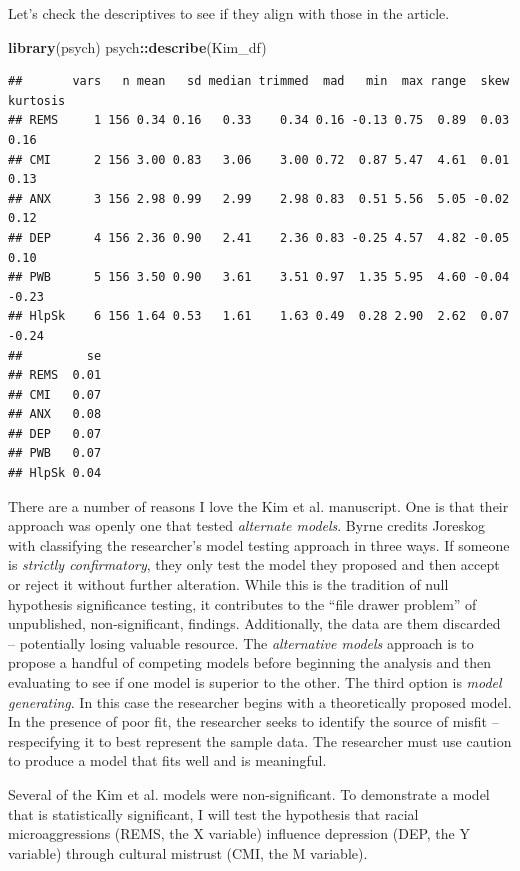\documentclass[
  11pt,
]{book}
\newenvironment{Shaded}{\begin{snugshade}}{\end{snugshade}}
\newcommand{\FunctionTok}[1]{\textcolor[rgb]{0.27,0.27,0.27}{\textbf{#1}}}
\newcommand{\NormalTok}[1]{#1}
\newcommand{\SpecialCharTok}[1]{\textcolor[rgb]{0.43,0.43,0.43}{\textbf{#1}}}
\begin{document}
Let's check the descriptives to see if they align with those in the article.

\begin{Shaded}
\begin{Highlighting}[]
\FunctionTok{library}\NormalTok{(psych)}
\NormalTok{psych}\SpecialCharTok{::}\FunctionTok{describe}\NormalTok{(Kim\_df)}
\end{Highlighting}
\end{Shaded}

\begin{verbatim}
##       vars   n mean   sd median trimmed  mad   min  max range  skew kurtosis
## REMS     1 156 0.34 0.16   0.33    0.34 0.16 -0.13 0.75  0.89  0.03     0.16
## CMI      2 156 3.00 0.83   3.06    3.00 0.72  0.87 5.47  4.61  0.01     0.13
## ANX      3 156 2.98 0.99   2.99    2.98 0.83  0.51 5.56  5.05 -0.02     0.12
## DEP      4 156 2.36 0.90   2.41    2.36 0.83 -0.25 4.57  4.82 -0.05     0.10
## PWB      5 156 3.50 0.90   3.61    3.51 0.97  1.35 5.95  4.60 -0.04    -0.23
## HlpSk    6 156 1.64 0.53   1.61    1.63 0.49  0.28 2.90  2.62  0.07    -0.24
##         se
## REMS  0.01
## CMI   0.07
## ANX   0.08
## DEP   0.07
## PWB   0.07
## HlpSk 0.04
\end{verbatim}

There are a number of reasons I love the Kim et al. \citeyearpar{kim_racial_2017} manuscript. One is that their approach was openly one that tested \emph{alternate models}. Byrne \citeyearpar{byrne_structural_2016} credits Joreskog \citep{bollen_testing_1993} with classifying the researcher's model testing approach in three ways. If someone is \emph{strictly confirmatory}, they only test the model they proposed and then accept or reject it without further alteration. While this is the tradition of null hypothesis significance testing, it contributes to the ``file drawer problem'' of unpublished, non-significant, findings. Additionally, the data are them discarded -- potentially losing valuable resource. The \emph{alternative models} approach is to propose a handful of competing models before beginning the analysis and then evaluating to see if one model is superior to the other. The third option is \emph{model generating}. In this case the researcher begins with a theoretically proposed model. In the presence of poor fit, the researcher seeks to identify the source of misfit -- respecifying it to best represent the sample data. The researcher must use caution to produce a model that fits well and is meaningful.

Several of the Kim et al. \citeyearpar{kim_racial_2017} models were non-significant. To demonstrate a model that is statistically significant, I will test the hypothesis that racial microaggressions (REMS, the X variable) influence depression (DEP, the Y variable) through cultural mistrust (CMI, the M variable).
\end{document}
